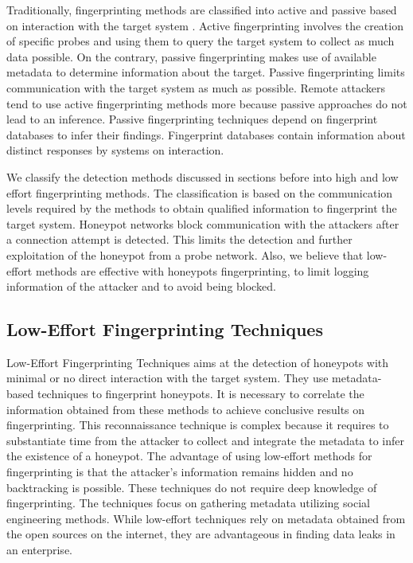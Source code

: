 \documentclass[../main.tex]{subfiles}
\begin{document}
Traditionally, fingerprinting methods are classified into active and passive based on interaction with the target system \cite{spitzner}. Active fingerprinting involves the creation of specific probes and using them to query the target system to collect as much data possible. On the contrary, passive fingerprinting makes use of available metadata to determine information about the target. Passive fingerprinting limits communication with the target system as much as possible. Remote attackers tend to use active fingerprinting methods more because passive approaches do not lead to an inference. Passive fingerprinting techniques depend on fingerprint databases to infer their findings. Fingerprint databases contain information about distinct responses by systems on interaction.
   
We classify the detection methods discussed in sections before into high and low effort fingerprinting methods. The classification is based on the communication levels required by the methods to obtain qualified information to fingerprint the target system. Honeypot networks block communication with the attackers after a connection attempt is detected. This limits the detection and further exploitation of the honeypot from a probe network. Also, we believe that low-effort methods are effective with honeypots fingerprinting, to limit logging information of the attacker and to avoid being blocked. 

 \subsection{Low-Effort Fingerprinting Techniques}
 Low-Effort Fingerprinting Techniques aims at the detection of honeypots with minimal or no direct interaction with the target system. They use metadata-based techniques to fingerprint honeypots. It is necessary to correlate the information obtained from these methods to achieve conclusive results on fingerprinting. This reconnaissance technique is complex because it requires to substantiate time from the attacker to collect and integrate the metadata to infer the existence of a honeypot. The advantage of using low-effort methods for fingerprinting is that the attacker's information remains hidden and no backtracking is possible. These techniques do not require deep knowledge of fingerprinting. The techniques focus on gathering metadata utilizing social engineering methods. While low-effort techniques rely on metadata obtained from the open sources on the internet, they are advantageous in finding data leaks in an enterprise. 
 
\end{document}
